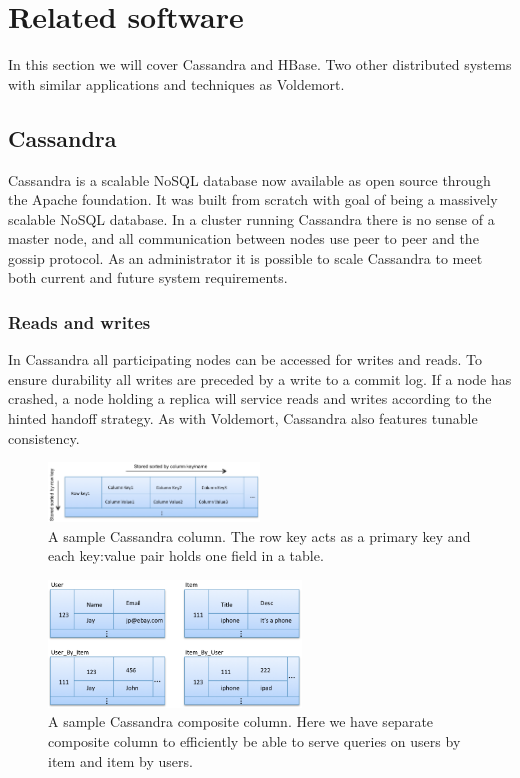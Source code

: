 \section{Related software}
\label{sec:related_software}
In this section we will cover Cassandra and HBase. Two other distributed systems with similar applications and techniques as Voldemort.

\subsection{Cassandra}
Cassandra is a scalable NoSQL database now available as open source through the Apache foundation. It was built from scratch with goal of being a massively scalable NoSQL database. In a cluster running Cassandra there is no sense of a master node, and all communication between nodes use peer to peer and the gossip protocol. As an administrator it is possible to scale Cassandra to meet both current and future system requirements. 

\subsubsection{Reads and writes}
In Cassandra all participating nodes can be accessed for writes and reads. To ensure durability all writes are preceded by a write to a commit log. If a node has crashed, a node holding a replica will service reads and writes according to the hinted handoff strategy. As with Voldemort, Cassandra also features tunable consistency. 

\begin{figure}[h]
    \centering
    \includegraphics[width=0.5\textwidth]{background/figures/cas_col.png}
    \caption{A sample Cassandra column\protect\footnotemark. The row key acts as a primary key and each key:value pair holds one field in a table.}
    \label{fig:sample_col}
\end{figure}

\begin{figure}[h]
    \centering
    \includegraphics[width=0.6\textwidth]{background/figures/cas_comp_col.png}
    \caption{A sample Cassandra composite column. Here we have separate composite column to efficiently be able to serve queries on users by item and item by users.}
    \label{fig:sample_comp_col}
\end{figure}

